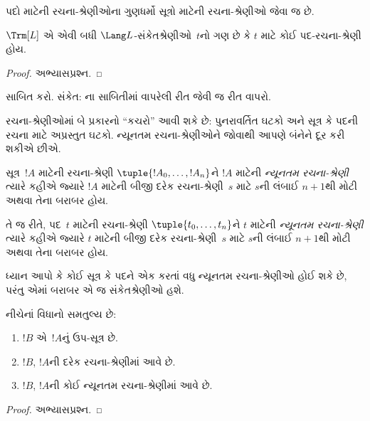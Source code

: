 પદો માટેની રચના-શ્રેણીઓના ગુણધર્મો સૂત્રો માટેની
રચના-શ્રેણીઓ જેવા જ છે.

\begin{prop}
$\Trm[L]$ એ એવી બધી $\Lang L$-સંકેતશ્રેણીઓ~$t$નો ગણ છે કે
$t$ માટે કોઈ પદ-રચના-શ્રેણી હોય.
\end{prop}

\begin{proof}
અભ્યાસપ્રશ્ન.
\end{proof}

\begin{prob}
 સાબિત કરો.
સંકેત: ના સાબિતીમાં
વાપરેલી રીત જેવી જ રીત વાપરો.
\end{prob}

રચના-શ્રેણીઓમાં બે પ્રકારનો ``કચરો'' આવી શકે છે: પુનરાવર્તિત ઘટકો
અને સૂત્ર કે પદની રચના માટે અપ્રસ્તુત ઘટકો. ન્યૂનતમ રચના-શ્રેણીઓને
જોવાથી આપણે બંનેને દૂર કરી શકીએ છીએ.

\begin{defn}
સૂત્ર~$!A$ માટેની રચના-શ્રેણી $\tuple{!A_0, \ldots, !A_n}$ને
$!A$ માટેની \emph{ન્યૂનતમ રચના-શ્રેણી} ત્યારે કહીએ જ્યારે $!A$ માટેની
બીજી દરેક રચના-શ્રેણી~$s$ માટે $s$ની લંબાઈ $n+1$થી મોટી અથવા તેના
બરાબર હોય.

તે જ રીતે, પદ~$t$ માટેની રચના-શ્રેણી $\tuple{t_0, \ldots, t_n}$ને
$t$ માટેની \emph{ન્યૂનતમ રચના-શ્રેણી} ત્યારે કહીએ જ્યારે $t$ માટેની
બીજી દરેક રચના-શ્રેણી~$s$ માટે $s$ની લંબાઈ $n+1$થી મોટી અથવા તેના
બરાબર હોય.
\end{defn}

ધ્યાન આપો કે કોઈ સૂત્ર કે પદને એક કરતાં વધુ ન્યૂનતમ રચના-શ્રેણીઓ
હોઈ શકે છે, પરંતુ એમાં બરાબર એ જ સંકેતશ્રેણીઓ હશે.

\begin{prop}
નીચેનાં વિધાનો સમતુલ્ય છે:
\begin{enumerate}
    \item $!B$ એ~$!A$નું ઉપ-સૂત્ર છે.
    \item $!B$, $!A$ની દરેક રચના-શ્રેણીમાં આવે છે.
    \item $!B$, $!A$ની કોઈ ન્યૂનતમ રચના-શ્રેણીમાં આવે છે.
\end{enumerate}
\end{prop}

\begin{proof}
અભ્યાસપ્રશ્ન.
\end{proof}

